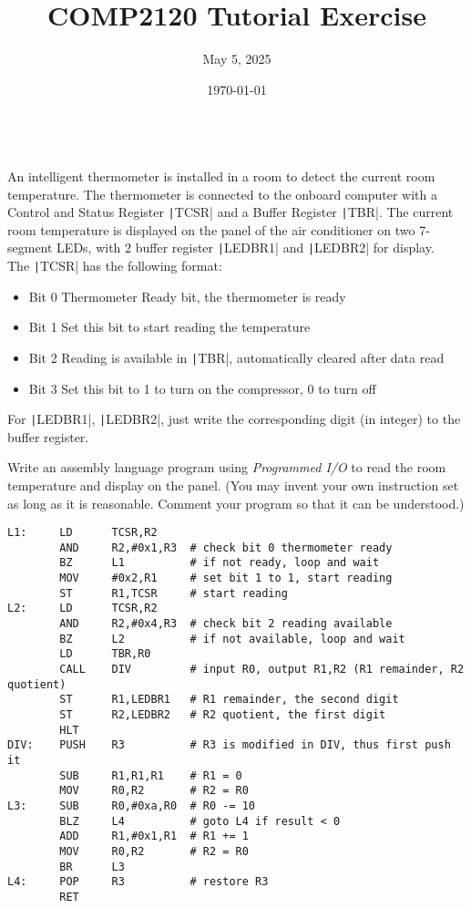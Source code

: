 \documentclass[answers]{exam}
\title{COMP2120 Tutorial Exercise}
\author{May 5, 2025}
\date{\today}
\begin{document}
\maketitle

\begin{questions}

     \\
    An intelligent thermometer is installed in a room to detect the current room temperature.
    The thermometer is connected to the onboard computer with a Control and Status Register \texttt|TCSR| and a Buffer Register \texttt|TBR|.
    The current room temperature is displayed on the panel of the air conditioner on two 7-segment LEDs, with 2 buffer register \texttt|LEDBR1| and \texttt|LEDBR2| for display.\\
    The \texttt|TCSR| has the following format:
    \begin{itemize}
        \item[] Bit 0   Thermometer Ready bit, the thermometer is ready
        \item[] Bit 1   Set this bit to start reading the temperature
        \item[] Bit 2   Reading is available in \texttt|TBR|, automatically cleared after data read
        \item[] Bit 3   Set this bit to 1 to turn on the compressor, 0 to turn off
    \end{itemize}

    For \texttt|LEDBR1|, \texttt|LEDBR2|, just write the corresponding digit (in integer) to the buffer register.

    Write an assembly language program using \textit{Programmed I/O} to read the room temperature and display on the panel. (You may invent your own instruction set as long as it is reasonable. Comment your program so that it can be understood.)

    \begin{solution}
        \begin{verbatim}
L1:     LD      TCSR,R2
        AND     R2,#0x1,R3  # check bit 0 thermometer ready
        BZ      L1          # if not ready, loop and wait
        MOV     #0x2,R1     # set bit 1 to 1, start reading
        ST      R1,TCSR     # start reading
L2:     LD      TCSR,R2     
        AND     R2,#0x4,R3  # check bit 2 reading available
        BZ      L2          # if not available, loop and wait
        LD      TBR,R0
        CALL    DIV         # input R0, output R1,R2 (R1 remainder, R2 quotient)
        ST      R1,LEDBR1   # R1 remainder, the second digit
        ST      R2,LEDBR2   # R2 quotient, the first digit
        HLT
DIV:    PUSH    R3          # R3 is modified in DIV, thus first push it
        SUB     R1,R1,R1    # R1 = 0
        MOV     R0,R2       # R2 = R0
L3:     SUB     R0,#0xa,R0  # R0 -= 10
        BLZ     L4          # goto L4 if result < 0
        ADD     R1,#0x1,R1  # R1 += 1
        MOV     R0,R2       # R2 = R0
        BR      L3
L4:     POP     R3          # restore R3
        RET
    \end{verbatim}
    \end{solution}


\end{questions}
\end{document}
